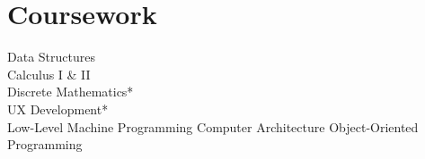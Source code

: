 \documentclass[]{hieudo-build}
\begin{document}
\begin{minipage}[t]{0.34\textwidth}
\section{Coursework}
Data Structures \\
Calculus I \& II \\
Discrete Mathematics* \\
UX Development* \\
Low-Level Machine Programming
Computer Architecture
Object-Oriented Programming \\
\sectionsep



\sectionsep
{}

%
%
\end{minipage} 
\hfill
\end{document}
